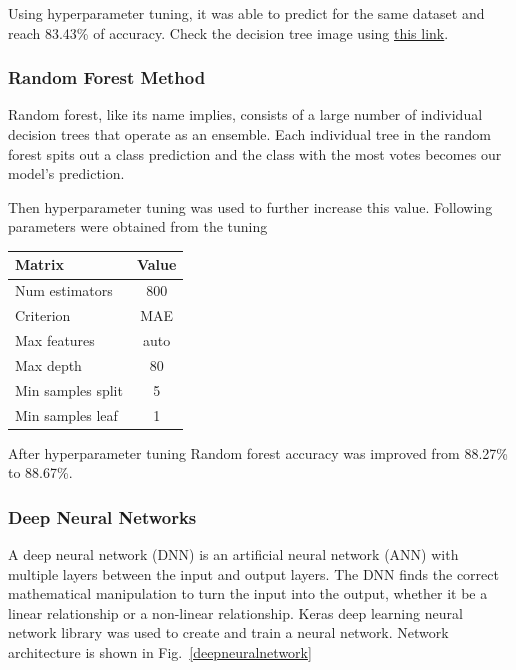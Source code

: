 Using hyperparameter tuning, it was able to predict for the same dataset and reach 83.43\% of accuracy. Check the decision tree image using \href{https://github.com/DulanGit/In20-S1-CS5617-project-1/blob/master/output/Decision_Tree.png} {this link}. \\

\subsubsection{Random Forest Method}

Random forest, like its name implies, consists of a large number of individual decision trees that operate as an ensemble. Each individual tree in the random forest spits out a class prediction and the class with the most votes becomes our model’s prediction.

Then hyperparameter tuning was used to further increase this value. Following parameters were obtained from the tuning

\begin{center}
\begin{tabular}{ |l|c| } 
 \hline
 Matrix & Value  \\ 
 \hline
Num estimators & 800 \\
Criterion & MAE \\
Max features & auto \\
Max depth & 80 \\
Min samples split & 5  \\
Min samples leaf & 1 \\
 \hline
\end{tabular}
\end{center}
After hyperparameter tuning Random forest accuracy was improved from 88.27\% to  88.67\%. \\

\subsubsection{Deep Neural Networks}

A deep neural network (DNN) is an artificial neural network (ANN) with multiple layers between the input and output layers. The DNN finds the correct mathematical manipulation to turn the input into the output, whether it be a linear relationship or a non-linear relationship. Keras deep learning neural network \cite{Keras} library was used to create and train a neural network. Network architecture is shown in Fig.~\ref{deepneuralnetwork}

